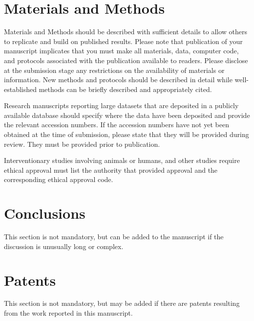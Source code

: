 \documentclass[hydrology,article,submit,moreauthors,pdftex]{Definitions/mdpi}
\begin{document}
\section{Materials and Methods}

Materials and Methods should be described with sufficient details to allow others to replicate and build on published results. Please note that publication of your manuscript implicates that you must make all materials, data, computer code, and protocols associated with the publication available to readers. Please disclose at the submission stage any restrictions on the availability of materials or information. New methods and protocols should be described in detail while well-established methods can be briefly described and appropriately cited.

Research manuscripts reporting large datasets that are deposited in a publicly available database should specify where the data have been deposited and provide the relevant accession numbers. If the accession numbers have not yet been obtained at the time of submission, please state that they will be provided during review. They must be provided prior to publication.

Interventionary studies involving animals or humans, and other studies require ethical approval must list the authority that provided approval and the corresponding ethical approval code. 

\section{Conclusions}

This section is not mandatory, but can be added to the manuscript if the discussion is unusually long or complex.

\section{Patents}
This section is not mandatory, but may be added if there are patents resulting from the work reported in this manuscript.

\vspace{6pt} 

\end{document}
